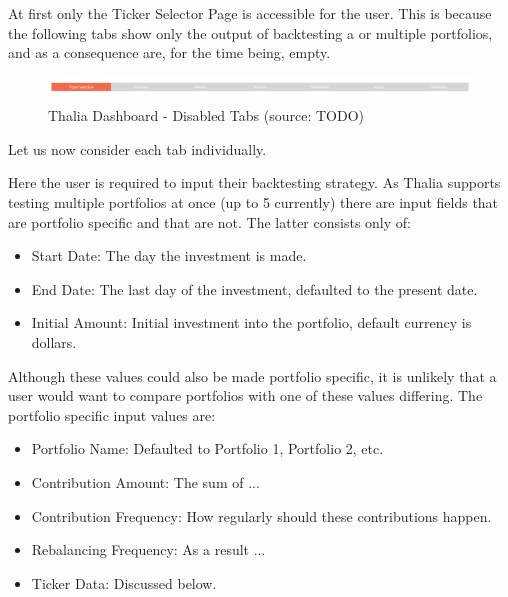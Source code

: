 \documentclass[main.tex]{subfiles}
\begin{document}
At first only the Ticker Selector Page is accessible for the user. 
This is because the following tabs show only the output of backtesting a or multiple portfolios, and as a consequence are, for the time being, empty.

\begin{figure}[H]
   \centering
   \includegraphics[width=\textwidth]{08Appendices/081User/081Pictures/disabled_tabs.png}
   \caption{Thalia Dashboard - Disabled Tabs (source: TODO)}
   \label{thalia_disabled_tabs}
\end{figure}

Let us now consider each tab individually. 


Here the user is required to input their backtesting strategy. As Thalia supports testing multiple portfolios at once (up to 5 currently) there are input fields that are 
portfolio specific and that are not. The latter consists only of:

\begin{itemize}
    \item Start Date: The day the investment is made.
    \item End Date: The last day of the investment, defaulted to the present date.
    \item Initial Amount: Initial investment into the portfolio, default currency is dollars.
\end{itemize}

Although these values could also be made portfolio specific, it is unlikely that a user would want to compare portfolios with one of these values differing.
The portfolio specific input values are:

\begin{itemize}
    \item Portfolio Name: Defaulted to Portfolio 1, Portfolio 2, etc. 
    \item Contribution Amount: The sum of ...
    \item Contribution Frequency: How regularly should these contributions happen.
    \item Rebalancing Frequency: As a result ...
    \item Ticker Data: Discussed below.
\end{itemize}
\end{document}
